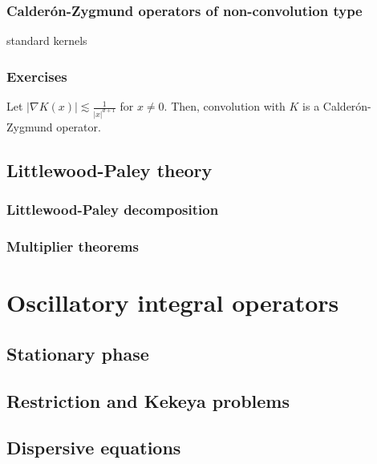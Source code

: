 \documentclass{../note}
\begin{document}
\section{Calder\'on-Zygmund operators of non-convolution type}
standard kernels



\section*{Exercises}
\begin{prb}
Let $|\nabla K(x)|\lesssim\frac1{|x|^{d+1}}$ for $x\ne0$.
Then, convolution with $K$ is a Calder\'on-Zygmund operator.
\end{prb}




\chapter{Littlewood-Paley theory}
\section{Littlewood-Paley decomposition}
\section{Multiplier theorems}

\chapter{}


\part{Oscillatory integral operators}

\chapter{Stationary phase}

\chapter{Restriction and Kekeya problems}

\chapter{Dispersive equations}
\end{document}
